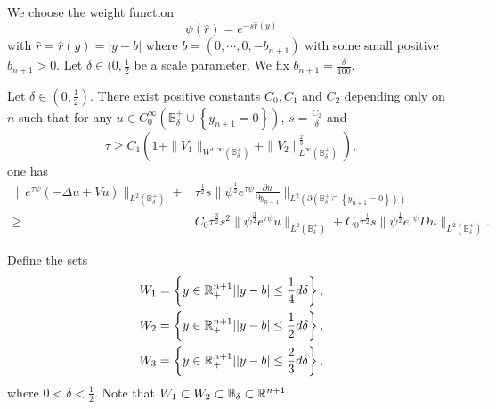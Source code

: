 We choose the weight function
\[
\psi(\widehat{r})=e^{-s\widehat{r}(y)}
\] 
with $\widehat{r}=\widehat{r}(y)=|y-b|$ where $b=\left( 0,\cdots ,0,-b_{n+1} \right) $ with some small positive $b_{n+1}>0$. Let $\delta \in (0,\frac{1}{2}$ be a scale parameter. We fix $b_{n+1}= \frac{\delta}{100}$.

\begin{proposition}
	Let $ \delta \in \left(0,\frac{1}{2}\right)$. There exist positive constants $C_0,C_1$ and  $C_2$ depending only on $n$ such that for any $u\in C_0^{\infty}\left( \mathbb{B}_{\delta}^{+} \cup \left\{y_{n+1}=0\right\}  \right) $, $\displaystyle s= \frac{C_2}{\delta}$ and 
	\[
	\tau \ge C_1 \left( 1+\|V_1\|_{W^{1,\infty}\left( \mathbb{B}_{\delta}^{+} \right) } +\|V_2\|^{\frac{2}{3}}_{L^{\infty}\left( \mathbb{B}_{\delta}^{+} \right) } \right), 
	\] 
	one has
	\begin{equation}
		\begin{aligned}
			\|e^{\tau \psi}\left( -\Delta u+Vu \right) \|_{L^2\left( \mathbb{B}_{\delta}^{+} \right) }+&\tau^{\frac{1}{2}} s\|\psi^{\frac{1}{2}}e^{\tau \psi} \frac{\partial u}{\partial y_{n+1}}\|_{L^2\left( \partial \left( \mathbb{B}_{\delta}^{+}\cap \left\{y_{n+1}=0\right\}  \right)  \right) }\\
			\ge & C_0\tau^{\frac{3}{2}}s^2\|\psi^{\frac{3}{2}}e^{\tau \psi}u\|_{L^2\left( \mathbb{B}_{\delta}^{+} \right) }+C_0\tau^{\frac{1}{2}}s \| \psi ^{\frac{1}{2}}e^{\tau \psi}Du\|_{L^2\left( \mathbb{B}_{\delta}^{+} \right) }
		.\end{aligned}
	\end{equation}
\end{proposition}

Define the sets
\begin{equation*}
	\begin{aligned}
		W_1&= \left\{y \in \mathbb{R}^{n+1}_{+}\lvert |y-b|\le \frac{1}{4}d \delta\right\}, \\
		W_2&= \left\{y\in \mathbb{R}_{+}^{n+1}\lvert |y-b|\le \frac{1}{2} d \delta\right\}, \\
		W_3&=\left\{y\in \mathbb{R}^{n+1}_{+}\lvert |y-b|\le \frac{2}{3}d \delta\right\} ,
	\end{aligned}
\end{equation*}where $0<\delta<\frac{1}{2}$. Note that $W_1\subset W_2\subset \mathbb{B}_{\delta}\subset \mathbb{R}^{n+1}$.

